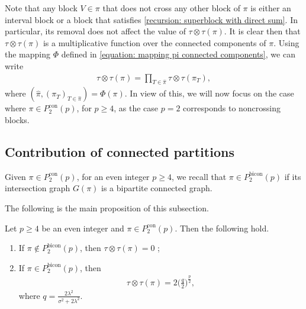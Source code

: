 \documentclass[12pt,reqno]{amsart}
\theoremstyle{plain}
\newcommand{\1}{\mathbf{1}}
\begin{document}
Note that any block $V \in \pi$ that does not cross any other block of $\pi$ is either an interval block or a block that satisfies \ref{recursion: superblock with direct sum}. In particular, its removal does not affect the value of $\tau\otimes \tau(\pi)$. It is clear then that $\tau\otimes \tau(\pi)$ is a multiplicative function \cite{BS1996} over the connected components of $\pi$. Using the mapping $\Phi$ defined in \eqref{equation: mapping pi connected components}, we can write
\begin{align}\label{equation: decomposition of tau in connected parts}
    \tau\otimes \tau(\pi)=\prod_{T \in \hat{\pi}}\tau\otimes \tau (\pi_T),
\end{align}
where $(\hat{\pi},(\pi_T)_{T \in \hat{\pi}})=\Phi(\pi)$. 
In view of this, we will now focus on the case where $\pi \in P_2^{\operatorname{con}}(p)$, for $p \ge 4$, as the case $p=2$ corresponds to noncrossing blocks.





\subsection{Contribution of connected partitions}\label{subsection: contribution of connected partitions}

Given $\pi\in P_2^{\operatorname{con}}(p)$, for an even integer $p \ge 4$, we recall that $\pi \in P_2^{\operatorname{bicon}}(p)$ if its intersection graph $G(\pi)$ is a bipartite connected graph.

The following is the main proposition of this subsection.
\begin{proposition}\label{proposition: contribution bipartite connected part}
    Let $p \ge 4$ be an even integer and $\pi \in P_2^{\operatorname{con}}(p)$. Then the following hold.
    \begin{enumerate}
        \item If $\pi \notin P_2^{\operatorname{bicon}}(p)$, then $\tau\otimes \tau(\pi)=0$ ;
        \item If $\pi \in P_2^{\operatorname{bicon}}(p)$, then
        \begin{align*}
        \tau\otimes \tau(\pi)=2 \Big(\frac{q}{2}\Big)^{\frac{p}{2}},
        \end{align*}
        where $q=\frac{2\lambda^2}{\sigma^2+2\lambda^2}$.
    \end{enumerate}    
\end{proposition}
\end{document}
